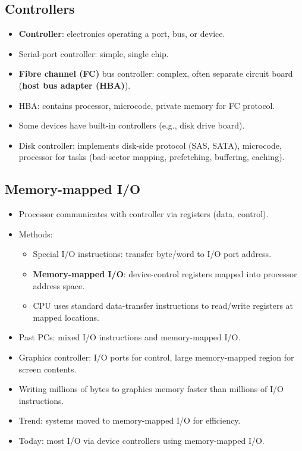 \subsection{Controllers}
\begin{itemize}
    \item \textbf{Controller}: electronics operating a port, bus, or device.
    \item Serial-port controller: simple, single chip.
    \item \textbf{Fibre channel (FC)} bus controller: complex, often separate circuit board (\textbf{host bus adapter (HBA)}).
    \item HBA: contains processor, microcode, private memory for FC protocol.
    \item Some devices have built-in controllers (e.g., disk drive board).
    \item Disk controller: implements disk-side protocol (SAS, SATA), microcode, processor for tasks (bad-sector mapping, prefetching, buffering, caching).
\end{itemize}

\subsection{Memory-mapped I/O}
\begin{itemize}
    \item Processor communicates with controller via registers (data, control).
    \item Methods:
    \begin{itemize}
        \item Special I/O instructions: transfer byte/word to I/O port address.
        \item \textbf{Memory-mapped I/O}: device-control registers mapped into processor address space.
        \item CPU uses standard data-transfer instructions to read/write registers at mapped locations.
    \end{itemize}
    \item Past PCs: mixed I/O instructions and memory-mapped I/O.
    \item Graphics controller: I/O ports for control, large memory-mapped region for screen contents.
    \item Writing millions of bytes to graphics memory faster than millions of I/O instructions.
    \item Trend: systems moved to memory-mapped I/O for efficiency.
    \item Today: most I/O via device controllers using memory-mapped I/O.
\end{itemize}

